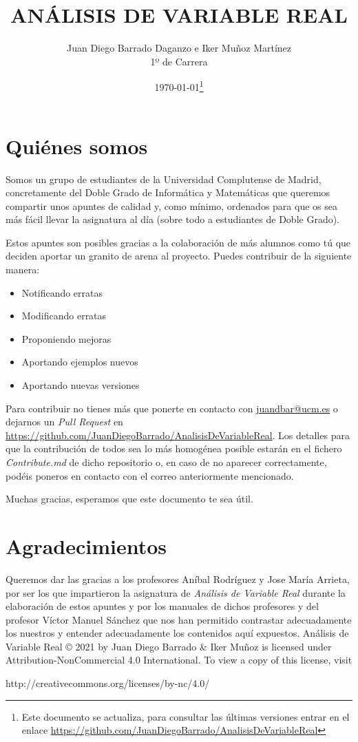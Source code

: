\documentclass[10pt,a4paper,openright]{book}
\title{ANÁLISIS DE VARIABLE REAL}
\author{Juan Diego Barrado Daganzo e Iker Muñoz Martínez\\1º de Carrera} %
\date{\today\footnote{Este documento se actualiza, para consultar las últimas versiones entrar en el enlace \url{https://github.com/JuanDiegoBarrado/AnalisisDeVariableReal}}}
\theoremstyle{break}
\begin{document}
\maketitle
\frontmatter
\section*{Quiénes somos}
Somos un grupo de estudiantes de la Universidad Complutense de Madrid, concretamente del Doble Grado de Informática y Matemáticas que queremos compartir unos apuntes de calidad y, como mínimo, ordenados para que os sea más fácil llevar la asignatura al día (sobre todo a estudiantes de Doble Grado).

Estos apuntes son posibles gracias a la colaboración de más alumnos como tú que deciden aportar un granito de arena al proyecto. Puedes contribuir de la siguiente manera:
\begin{itemize}
\item Notificando erratas
\item Modificando erratas
\item Proponiendo mejoras
\item Aportando ejemplos nuevos
\item Aportando nuevas versiones
\end{itemize}
Para contribuir no tienes más que ponerte en contacto con \href{mailto:juandbar@ucm.es}{juandbar@ucm.es} o dejarnos un \textit{Pull Request} en \url{https://github.com/JuanDiegoBarrado/AnalisisDeVariableReal}. Los detalles para que la contribución de todos sea lo más homogénea posible estarán en el fichero \textit{Contribute.md} de dicho repositorio o, en caso de no aparecer correctamente, podéis poneros en contacto con el correo anteriormente mencionado.

Muchas gracias, esperamos que este documento te sea útil.

\section*{Agradecimientos}
Queremos dar las gracias a los profesores Aníbal Rodríguez y Jose María Arrieta, por ser los que impartieron la asignatura de \textit{Análisis de Variable Real} durante la elaboración de estos apuntes y por los manuales de dichos profesores y del profesor Víctor Manuel Sánchez que nos han permitido contrastar adecuadamente los nuestros y entender adecuadamente los contenidos aquí expuestos.
\vfill
Análisis de Variable Real © 2021 by Juan Diego Barrado \& Iker Muñoz is licensed under Attribution-NonCommercial 4.0 International. To view a copy of this license, visit
\begin{center}
http://creativecommons.org/licenses/by-nc/4.0/
\end{center}
\end{document}
